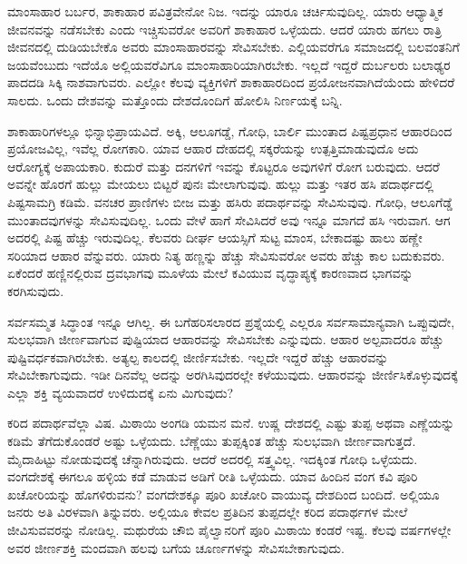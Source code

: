 ಮಾಂಸಾಹಾರ ಬರ್ಬರ, ಶಾಕಾಹಾರ ಪವಿತ್ರವೇನೋ ನಿಜ. ಇದನ್ನು ಯಾರೂ ಚರ್ಚಿಸುವುದಿಲ್ಲ. ಯಾರು ಆಧ್ಯಾತ್ಮಿಕ ಜೀವನವನ್ನು ನಡೆಸಬೇಕು ಎಂದು ಇಚ್ಚಿಸುವರೋ ಅವರಿಗೆ ಶಾಕಾಹಾರ ಒಳ್ಳೆಯದು. ಆದರೆ ಯಾರು ಹಗಲು ರಾತ್ರಿ ಜೀವನದಲ್ಲಿ ದುಡಿಯ\break ಬೇಕೊ ಅವರು ಮಾಂಸಾಹಾರವನ್ನು ಸೇವಿಸಬೇಕು. ಎಲ್ಲಿಯವರೆಗೂ ಸಮಾಜದಲ್ಲಿ ಬಲವಂತನಿಗೆ ಜಯವೆಂಬುದು ಇದೆಯೊ ಅಲ್ಲಿಯವರೆವಿಗೂ ಮಾಂಸಾಹಾರಿಯಾಗಿರಬೇಕು. ಇಲ್ಲದೆ ಇದ್ದರೆ ದುರ್ಬಲರು ಬಲಾಢ್ಯರ ಪಾದದಡಿ ಸಿಕ್ಕಿ ನಾಶವಾಗುವರು. ಎಲ್ಲೋ ಕೆಲವು ವ್ಯಕ್ತಿಗಳಿಗೆ ಶಾಕಾಹಾರದಿಂದ ಪ್ರಯೋಜನವಾಗಿದೆಯೆಂದು ಹೇಳಿದರೆ ಸಾಲದು. ಒಂದು ದೇಶವನ್ನು ಮತ್ತೊಂದು ದೇಶದೊಂದಿಗೆ ಹೋಲಿಸಿ ನಿರ್ಣಯಕ್ಕೆ ಬನ್ನಿ.

ಶಾಕಾಹಾರಿಗಳಲ್ಲೂ ಭಿನ್ನಾಭಿಪ್ರಾಯವಿದೆ. ಅಕ್ಕಿ, ಆಲೂಗಡ್ಡೆ, ಗೋಧಿ, ಬಾರ್ಲಿ ಮುಂತಾದ ಪಿಷ್ಟಪ್ರಧಾನ ಆಹಾರದಿಂದ ಪ್ರಯೋಜವಿಲ್ಲ, ಇವೆಲ್ಲ ರೋಗಕಾರಿ. ಯಾವ ಆಹಾರ ದೇಹದಲ್ಲಿ ಸಕ್ಕರೆಯನ್ನು ಉತ್ಪತ್ತಿಮಾಡುವುದೊ ಅದು ಆರೋಗ್ಯಕ್ಕೆ ಅಪಾಯಕಾರಿ. ಕುದುರೆ ಮತ್ತು ದನಗಳಿಗೆ ಇವನ್ನು ಕೊಟ್ಟರೂ ಅವುಗಳಿಗೆ ರೋಗ ಬರುವುದು. ಆದರೆ ಅವನ್ನೇ ಹೊರಗೆ ಹುಲ್ಲು ಮೇಯಲು ಬಿಟ್ಟರೆ ಪುನಃ ಮೇಲಾಗುವುವು. ಹುಲ್ಲು ಮತ್ತು ಇತರ ಹಸಿ ಪದಾರ್ಥದಲ್ಲಿ ಪಿಷ್ಟಸಾಮಗ್ರಿ ಕಡಿಮೆ. ವನಚರ ಪ್ರಾಣಿಗಳು ಬೀಜ ಮತ್ತು ಹಸಿರು ಪದಾರ್ಥವನ್ನು ಸೇವಿಸುವುವು. ಗೋಧಿ, ಆಲೂಗೆಡ್ಡೆ ಮುಂತಾದವುಗಳನ್ನು ಸೇವಿಸುವುದಿಲ್ಲ. ಒಂದು ವೇಳೆ ಹಾಗೆ ಸೇವಿಸಿದರೆ ಅವು ಇನ್ನೂ ಮಾಗದೆ ಹಸಿ ಇರುವಾಗ. ಆಗ ಅದರಲ್ಲಿ ಪಿಷ್ಟ ಹೆಚ್ಚು ಇರುವುದಿಲ್ಲ. ಕೆಲವರು ದೀರ್ಘ ಆಯಸ್ಸಿಗೆ ಸುಟ್ಟ ಮಾಂಸ, ಬೇಕಾದಷ್ಟು ಹಾಲು ಹಣ್ಣೇ ಸರಿಯಾದ ಆಹಾರ ವೆನ್ನುವರು. ಯಾರು ನಿತ್ಯ ಹಣ್ಣನ್ನು ಹೆಚ್ಚು ಸೇವಿಸುವರೋ ಅವರು ಹೆಚ್ಚು ಕಾಲ ಬದುಕುವರು. ಏಕೆಂದರೆ ಹಣ್ಣಿನಲ್ಲಿರುವ ದ್ರವಭಾಗವು ಮೂಳೆಯ ಮೇಲೆ ಕವಿಯುವ ವೃದ್ಧಾಪ್ಯಕ್ಕೆ ಕಾರಣವಾದ ಭಾಗವನ್ನು ಕರಗಿಸುವುದು.

ಸರ್ವಸಮ್ಮತ ಸಿದ್ಧಾಂತ ಇನ್ನೂ ಆಗಿಲ್ಲ. ಈ ಬಗೆಹರಿಸಲಾರದ ಪ್ರಶ್ನೆಯಲ್ಲಿ ಎಲ್ಲರೂ ಸರ್ವಸಾಮಾನ್ಯವಾಗಿ ಒಪ್ಪುವುದೇ, ಸುಲಭವಾಗಿ ಜೀರ್ಣವಾಗುವ ಪುಷ್ಟಿಯಾದ ಆಹಾರವನ್ನು ಸೇವಿಸಬೇಕು ಎನ್ನುವುದು. ಆಹಾರ ಅಲ್ಪವಾದರೂ ಹೆಚ್ಚು ಪುಷ್ಟಿವರ್ಧಕವಾಗಿರಬೇಕು. ಅತ್ಯಲ್ಪ ಕಾಲದಲ್ಲಿ ಜೀರ್ಣಿಸಬೇಕು. ಇಲ್ಲದೇ ಇದ್ದರೆ ಹೆಚ್ಚು ಆಹಾರವನ್ನು ಸೇವಿಬೇಕಾಗು\break ವುದು. ಇಡೀ ದಿನವೆಲ್ಲ ಅದನ್ನು ಅರಗಿಸಿವುದರಲ್ಲೇ ಕಳೆಯುವುದು. ಆಹಾರವನ್ನು ಜೀರ್ಣಿಸಿಕೊಳ್ಳುವುದಕ್ಕೆ ಎಲ್ಲಾ ಶಕ್ತಿ ವ್ಯಯವಾದರೆ ಉಳಿದುದಕ್ಕೆ ಏನು ಮಿಗುವುದು?

ಕರಿದ ಪದಾರ್ಥವೆಲ್ಲಾ ವಿಷ. ಮಿಠಾಯಿ ಅಂಗಡಿ ಯಮನ ಮನೆ. ಉಷ್ಣ ದೇಶದಲ್ಲಿ ಎಷ್ಟು ತುಪ್ಪ ಅಥವಾ ಎಣ್ಣೆಯನ್ನು ಕಡಿಮೆ ತೆಗೆದುಕೊಂಡರೆ ಅಷ್ಟು ಒಳ್ಳೆಯದು. ಬೆಣ್ಣೆಯು ತುಪ್ಪಕ್ಕಿಂತ ಹೆಚ್ಚು ಸುಲಭವಾಗಿ ಜೀರ್ಣವಾಗುತ್ತದೆ. ಮೈದಾಹಿಟ್ಟು ನೋಡುವುದಕ್ಕೆ ಚೆನ್ನಾಗಿರುವುದು. ಆದರೆ ಅದರಲ್ಲಿ ಸತ್ತ್ವವಿಲ್ಲ. ಇದಕ್ಕಿಂತ ಗೋಧಿ ಒಳ್ಳೆಯದು. ವಂಗದೇಶಕ್ಕೆ ಈಗಲೂ ಹಳ್ಳಿಯ ಕಡೆ ಮಾಡುವ ಅಡಿಗೆ ರೀತಿ ಒಳ್ಳೆಯದು. ಯಾವ ಹಿಂದಿನ ವಂಗ ಕವಿ ಪೂರಿ ಖಚೋರಿಯನ್ನು ಹೊಗಳಿರುವನು? ವಂಗದೇಶಕ್ಕೂ ಪೂರಿ ಖಚೋರಿ ವಾಯುವ್ಯ ದೇಶದಿಂದ ಬಂದಿದೆ. ಅಲ್ಲಿಯೂ ಜನರು ಅತಿ ವಿರಳವಾಗಿ ತಿನ್ನುವರು. ಅಲ್ಲಿಯೂ ಕೇವಲ ಪ್ರತಿದಿನ ತುಪ್ಪದಲ್ಲೇ ಕರಿದ ಪದಾರ್ಥಗಳ ಮೇಲೆ ಜೀವಿಸುವವರನ್ನು ನೋಡಿಲ್ಲ. ಮಥುರೆಯ ಚೌಬಿ ಪೈಲ್ವಾನರಿಗೆ ಪೂರಿ ಮಿಠಾಯಿ ಕಂಡರೆ ಇಷ್ಟ. ಕೆಲವು ವರ್ಷಗಳಲ್ಲೇ ಅವರ ಜೀರ್ಣಶಕ್ತಿ ಮಂದವಾಗಿ ಹಲವು ಬಗೆಯ ಚೂರ್ಣಗಳನ್ನು ಸೇವಿಸಬೇಕಾಗುವುದು.

